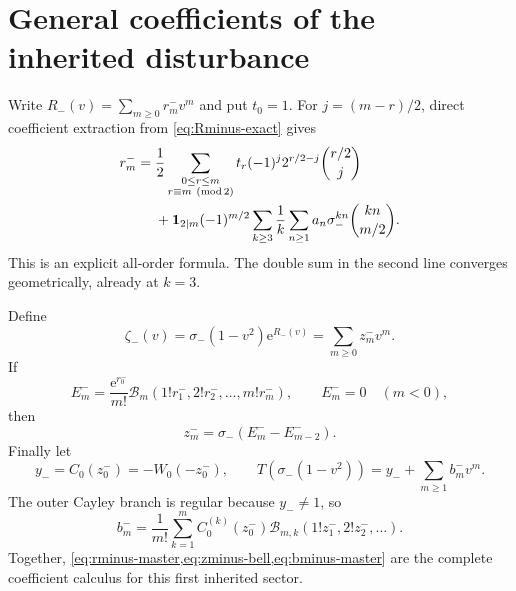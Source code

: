 \documentclass[11pt,a4paper,oneside,openany]{book}
\theoremstyle{definition}
\theoremstyle{remark}
\newcommand{\e}{\mathrm e}
\newcommand{\Bell}[1]{\mathcal B_{#1}}
\newcommand{\pBell}[2]{\mathcal B_{#1,#2}}
\begin{document}
\section{General coefficients of the inherited disturbance}
Write $R_-(v)=\sum_{m\ge0}r_m^-v^m$ and put $t_0=1$.  For
$j=(m-r)/2$, direct coefficient extraction from
\cref{eq:Rminus-exact} gives
\begin{align}
 r_m^-={}&\frac12
 \sum_{\substack{0\le r\le m\\r\equiv m\ (\mathrm{mod}\,2)}}
 t_r(-1)^j2^{r/2-j}\binom{r/2}{j}\notag\\
 &+\mathbf 1_{2\mid m}(-1)^{m/2}
 \sum_{k\ge3}\frac1k\sum_{n\ge1}a_n\sigma_-^{kn}
 \binom{kn}{m/2}.
 \label{eq:rminus-master}
\end{align}
This is an explicit all-order formula.  The double sum in the second line
converges geometrically, already at $k=3$.

Define
\begin{equation}
 \zeta_-(v)=\sigma_-(1-v^2)\e^{R_-(v)}
 =\sum_{m\ge0}z_m^-v^m.
 \label{eq:zetaminus-series}
\end{equation}
If
\begin{equation}
 E_m^-=\frac{\e^{r_0^-}}{m!}
 \Bell m(1!r_1^-,2!r_2^-,\ldots,m!r_m^-),
 \qquad E_m^-=0\quad(m<0),
 \label{eq:Eminus}
\end{equation}
then
\begin{equation}
 z_m^-=\sigma_-(E_m^--E_{m-2}^-).
 \label{eq:zminus-bell}
\end{equation}
Finally let
\begin{equation}
 y_-=C_0(z_0^-)=-W_0(-z_0^-),
 \qquad
 T(\sigma_-(1-v^2))=y_-+\sum_{m\ge1}b_m^-v^m.
 \label{eq:bminus-def}
\end{equation}
The outer Cayley branch is regular because $y_-\ne1$, so
\begin{equation}
 \boxed{
 b_m^-=\frac1{m!}\sum_{k=1}^m C_0^{(k)}(z_0^-)
 \pBell mk(1!z_1^-,2!z_2^-,\ldots).}
 \label{eq:bminus-master}
\end{equation}
Together,
\cref{eq:rminus-master,eq:zminus-bell,eq:bminus-master} are the complete
coefficient calculus for this first inherited sector.
\end{document}
